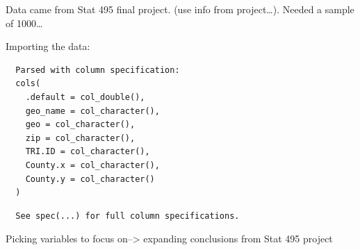 \documentclass[12pt,twoside]{amherstthesis}
\begin{document}
  Data came from Stat 495 final project. (use info from project\ldots{}).
  Needed a sample of 1000\ldots{}
  
  Importing the data:
  
  \begin{Shaded}
  \begin{Highlighting}[]
  \StringTok{ }\NormalTok{(}\NormalTok{)}
  \end{Highlighting}
  \end{Shaded}
  
  \begin{verbatim}
  Parsed with column specification:
  cols(
    .default = col_double(),
    geo_name = col_character(),
    geo = col_character(),
    zip = col_character(),
    TRI.ID = col_character(),
    County.x = col_character(),
    County.y = col_character()
  )
  \end{verbatim}
  
  \begin{verbatim}
  See spec(...) for full column specifications.
  \end{verbatim}
  
  \begin{Shaded}
  \begin{Highlighting}[]
  \NormalTok{(}\NormalTok{)}
  \StringTok{ }\NormalTok{data_subset[}\NormalTok{(}\OperatorTok{:}\NormalTok{,}
     \NormalTok{),]}
  \end{Highlighting}
  \end{Shaded}
  
  Picking variables to focus on--\textgreater{} expanding conclusions from
  Stat 495 project
  
  \begin{Shaded}
  \begin{Highlighting}[]
  \StringTok{ }\NormalTok{(}\NormalTok{, }\NormalTok{, }\NormalTok{, }\NormalTok{, }\NormalTok{, }\NormalTok{)}
  \StringTok{ }
  \end{Highlighting}
  \end{Shaded}
  
\end{document}
